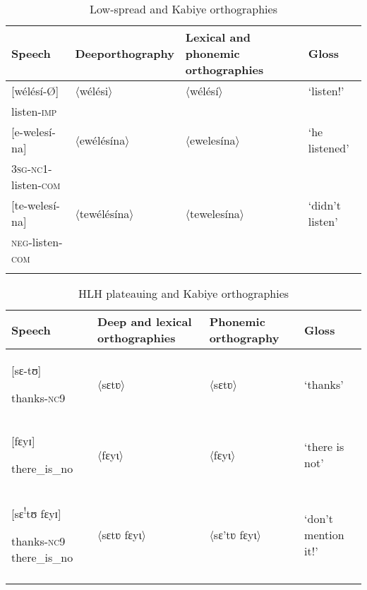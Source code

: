 \documentclass[output=paper]{langscibook}
\begin{document}
\begin{table}
    \begin{tabularx}{\textwidth}{lXQl}
        \lsptoprule
         Speech       & Deep\newline orthography  & Lexical and phonemic orthographies & Gloss\\\midrule
        {[wélésí-Ø]} & 〈wélési〉 & 〈wélésí〉 & ‘listen!’\\
        listen-\textsc{imp} &          &          &          \\
        {[e-welesí-na]}       & 〈ewélésína〉 & 〈ewelesína〉 & ‘he listened’\\
        \textsc{3sg-nc1}-listen-\textsc{com}   &             &             &               \\
        {[te-welesí-na]} & 〈tewélésína〉 & 〈tewelesína〉 & ‘didn’t listen’\\
        \textsc{neg}-listen-\textsc{com} &                &               &               \\
        \lspbottomrule
    \end{tabularx}
    \caption{Low-spread and Kabiye orthographies}
    \label{tab:cahill:19}
\end{table}




\begin{table}
    \begin{tabularx}{\textwidth}{QQQl}
    \lsptoprule
    Speech & Deep and lexical orthographies & Phonemic orthography & Gloss\\\midrule
    {[sɛ-tʊ]} 

    thanks-\textsc{nc9} & 〈sɛtʋ〉 & 〈sɛtʋ〉 & ‘thanks’\\
    {[fɛyɪ]}

    there\_is\_no & 〈fɛyɩ〉 & 〈fɛyɩ〉 & ‘there is not’\\
    {[sɛ\textsuperscript{!}tʊ fɛyɪ]}

    thanks-\textsc{nc9} there\_is\_no & 〈sɛtʋ fɛyɩ〉 & 〈sɛ’tʋ fɛyɩ〉 & ‘don’t mention it!’\\
    \lspbottomrule
    \end{tabularx}
    \caption{HLH plateauing and Kabiye orthographies}
    \label{tab:cahill:20}
\end{table}
\end{document}
